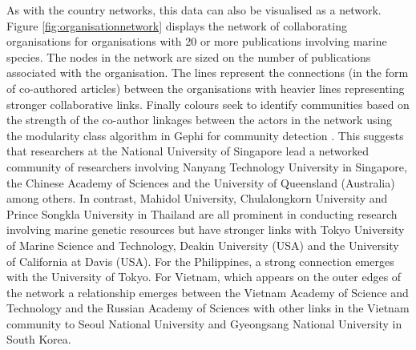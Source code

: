 \documentclass[]{book}
\theoremstyle{definition}
\theoremstyle{definition}
\theoremstyle{definition}
\theoremstyle{remark}
\begin{document}
As with the country networks, this data can also be visualised as a
network. Figure \ref{fig:organisationnetwork} displays the network of
collaborating organisations for organisations with 20 or more
publications involving marine species. The nodes in the network are
sized on the number of publications associated with the organisation.
The lines represent the connections (in the form of co-authored
articles) between the organisations with heavier lines representing
stronger collaborative links. Finally colours seek to identify
communities based on the strength of the co-author linkages between the
actors in the network using the modularity class algorithm in Gephi for
community detection \citep{Blondel_2008}. This suggests that researchers
at the National University of Singapore lead a networked community of
researchers involving Nanyang Technology University in Singapore, the
Chinese Academy of Sciences and the University of Queensland (Australia)
among others. In contrast, Mahidol University, Chulalongkorn University
and Prince Songkla University in Thailand are all prominent in
conducting research involving marine genetic resources but have stronger
links with Tokyo University of Marine Science and Technology, Deakin
University (USA) and the University of California at Davis (USA). For
the Philippines, a strong connection emerges with the University of
Tokyo. For Vietnam, which appears on the outer edges of the network a
relationship emerges between the Vietnam Academy of Science and
Technology and the Russian Academy of Sciences with other links in the
Vietnam community to Seoul National University and Gyeongsang National
University in South Korea.
\end{document}
